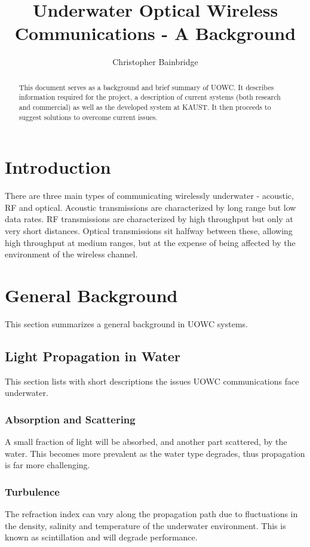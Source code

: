 \documentclass{article}
\author{Christopher Bainbridge}
\title{Underwater Optical Wireless Communications - A Background}
\begin{document}
\maketitle

\begin{abstract}
This document serves as a background and brief summary of \ac{UOWC}. It describes information required for the project, a description of current systems (both research and commercial) as well as the developed system at \ac{KAUST}. It then proceeds to suggest solutions to overcome current issues.
\end{abstract}

\section{Introduction}
There are three main types of communicating wirelessly underwater - acoustic, RF and optical. Acoustic transmissions are characterized by long range but low data rates. RF transmissions are characterized by high throughput but only at very short distances. Optical transmissions sit halfway between these, allowing high throughput at medium ranges, but at the expense of being affected by the environment of the wireless channel.

\section{General Background}
This section summarizes a general background in \ac{UOWC} systems.

\subsection{Light Propagation in Water}
This section lists with short descriptions the issues \ac{UOWC} communications face underwater.

\subsubsection{Absorption and Scattering}
A small fraction of light will be absorbed, and another part scattered, by the water. This becomes more prevalent as the water type degrades, thus propagation is far more challenging.

\subsubsection{Turbulence}
The refraction index can vary along the propagation path due to fluctuations in the density, salinity and temperature of the underwater environment. This is known as scintillation and will degrade performance.
\end{document}
